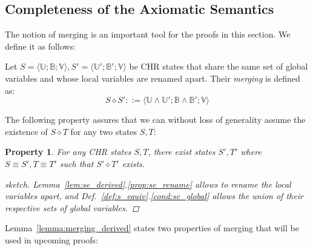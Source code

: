 \documentclass[acmtocl]{acmtrans2m}
\newtheorem{property}[theorem]{Property}
\newcommand\state[1]{\langle #1 \rangle}
\newcommand{\B}{\ensuremath{\mathbb{B}}}
\newcommand{\U}{\ensuremath{\mathbb{U}}}
\newcommand{\V}{\ensuremath{\mathbb{V}}}
\begin{document}
\subsection{Completeness of the Axiomatic Semantics}
	\label{sec:pt-completeness}

The notion of merging is an important tool for the proofs in this section. We
define it as follows:

\begin{definition}[($\cdot\diamond\cdot$)]
	\label{def:merging}
  Let $S=\state{\U;\B;\V}, S'=\state{\U';\B';\V}$ be CHR
  states that share the same set of global variables and whose local variables
  are renamed apart. Their \emph{merging} is defined as:
  \[
  	S\diamond S' ::=\state{\U\wedge\U';\B\wedge\B';\V}
  \]
\end{definition}

The following property assures that we can without loss of generality assume
the existence of $S\diamond T$ for any two states $S,T$:

\begin{property}\label{prop:generalityofmerging}
For any CHR states $S,T$, there exist states $S',T'$ where $S\equiv S',T\equiv
T'$ such that $S'\diamond T'$ exists.
\begin{proof}[sketch]
Lemma~\ref{lem:se_derived}.\ref{prop:se_rename} allows to rename the local
variables apart, and Def.~\ref{def:s_equiv}.\ref{cond:se_global} allows the
union of their respective sets of global variables.
\end{proof}
\end{property}

Lemma~\ref{lemma:merging_derived} states two properties of merging that will be
used in upcoming proofs:
\end{document}
